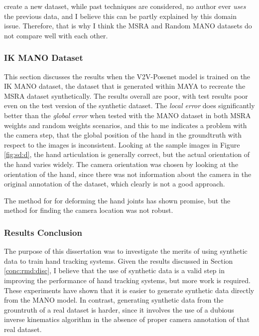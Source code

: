 create a new dataset, while past techniques are considered, no author ever {\slshape uses} the previous data, and I believe this can be partly explained by this domain issue. Therefore, that is why I think the MSRA and Random MANO datasets do not compare well with each other.

\subsubsection{IK MANO Dataset}
This section discusses the results when the V2V-Posenet model is trained on the IK MANO dataset, the dataset that is generated within MAYA to recreate the MSRA dataset synthetically. The results overall are poor, with test results poor even on the test version of the synthetic dataset. The {\slshape local error} does significantly better than the {\slshape global error} when tested with the MANO dataset in both MSRA weights and random weights scenarios, and this to me indicates a problem with the camera step, that the global position of the hand in the groundtruth with respect to the images is inconsistent. Looking at the sample images in Figure \ref{fig:sd:d}, the hand articulation is generally correct, but the actual orientation of the hand varies widely. The camera orientation was chosen by looking at the orientation of the hand, since there was not information about the camera in the original annotation of the dataset, which clearly is not a good approach.

The method for for deforming the hand joints has shown promise, but the method for finding the camera location was not robust.

\subsubsection{Results Conclusion}
The purpose of this dissertation was to investigate the merits of using synthetic data to train hand tracking systems. Given the results discussed in Section \ref{conc:rmd:disc}, I believe that the use of synthetic data is a valid step in improving the performance of hand tracking systems, but more work is required. These experiments have shown that it is easier to generate synthetic data directly from the MANO model. In contrast, generating synthetic data from the grountruth of a real dataset is harder, since it involves the use of a dubious inverse kinematics algorithm in the absence of proper camera annotation of that real dataset.

